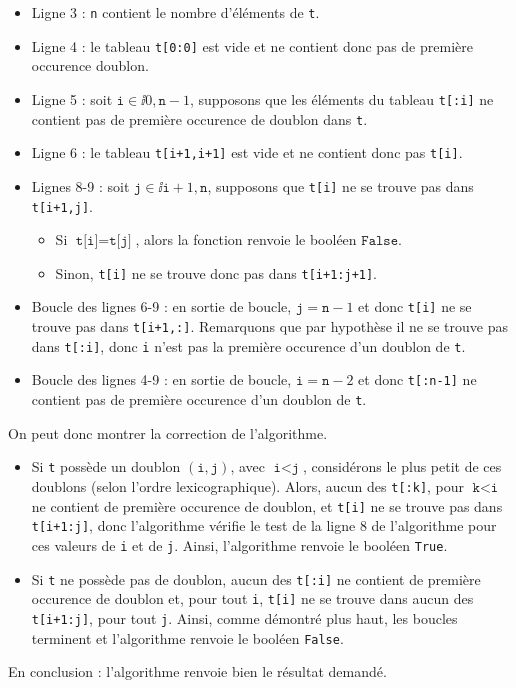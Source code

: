 \begin{itemize}
  \item[\textbullet] Ligne 3 : \texttt{n} contient le nombre d'éléments de \texttt{t}.
  \item[\textbullet] Ligne 4 : le tableau \texttt{t[0:0]} est vide et ne contient donc pas de première occurence doublon.
  \item[\textbullet] Ligne 5 : soit $\texttt{i} \in \ii{0,\texttt{n}-1}$, supposons que les éléments du tableau \texttt{t[:i]} ne contient pas de première occurence de doublon dans \texttt{t}. 
  \item[\textbullet] Ligne 6 : le tableau \texttt{t[i+1,i+1]} est vide et ne contient donc pas \texttt{t[i]}. 
  \item[\textbullet] Lignes 8-9 : soit $\texttt{j} \in \ii{\texttt{i}+1,\texttt{n}}$, supposons que \texttt{t[i]} ne se trouve pas dans \texttt{t[i+1,j]}. 
    \begin{itemize}
      \item Si $\texttt{t[i]} = \texttt{t[j]}$, alors la fonction renvoie le booléen $\texttt{False}$.
      \item Sinon, \texttt{t[i]} ne se trouve donc pas dans \texttt{t[i+1:j+1]}.
    \end{itemize}
  \item[\textbullet] Boucle des lignes 6-9 : en sortie de boucle, $\texttt{j} = \texttt{n}-1$ et donc \texttt{t[i]} ne se trouve pas dans \texttt{t[i+1,:]}. 
    Remarquons que par hypothèse il ne se trouve pas dans \texttt{t[:i]}, donc \texttt{i} n'est pas la première occurence d'un doublon de \texttt{t}.
  \item[\textbullet] Boucle des lignes 4-9 : en sortie de boucle, $\texttt{i} = \texttt{n}-2$ et donc \texttt{t[:n-1]} ne contient pas de première occurence d'un doublon de \texttt{t}.
\end{itemize}
On peut donc montrer la correction de l'algorithme. 
\begin{itemize}
  \item Si \texttt{t} possède un doublon $(\texttt{i},\texttt{j})$, avec $\texttt{i}<\texttt{j}$, considérons le plus petit de ces doublons (selon l'ordre lexicographique). 
    Alors, aucun des \texttt{t[:k]}, pour $\texttt{k}<\texttt{i}$ ne contient de première occurence de doublon, et \texttt{t[i]} ne se trouve pas dans \texttt{t[i+1:j]}, donc l'algorithme vérifie le test de la ligne 8 de l'algorithme pour ces valeurs de \texttt{i} et de \texttt{j}. 
    Ainsi, l'algorithme renvoie le booléen \texttt{True}.
  \item Si \texttt{t} ne possède pas de doublon, aucun des \texttt{t[:i]} ne contient de première occurence de doublon et, pour tout \texttt{i}, \texttt{t[i]} ne se trouve dans aucun des  \texttt{t[i+1:j]}, pour tout \texttt{j}. 
    Ainsi, comme démontré plus haut, les boucles terminent et l'algorithme renvoie le booléen \texttt{False}.
\end{itemize}
En conclusion : l'algorithme renvoie bien le résultat demandé.